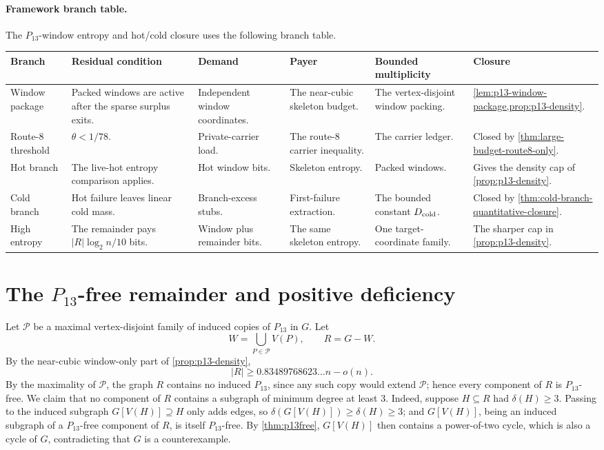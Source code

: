 \documentclass[11pt]{article}
\newcommand{\FrameworkBranchTableHeader}{%
\toprule
\textbf{Branch} & \textbf{Residual condition} & \textbf{Demand} & \textbf{Payer} & \textbf{Bounded multiplicity} & \textbf{Closure}\\
\midrule
}
\begin{document}
\paragraph{Framework branch table.}
The \(P_{13}\)-window entropy and hot/cold closure uses the following branch
table.
\begin{longtable}{L{0.13\textwidth} L{0.19\textwidth} L{0.14\textwidth} L{0.14\textwidth} L{0.17\textwidth} L{0.17\textwidth}}
\FrameworkBranchTableHeader
Window package
&
Packed windows are active after the sparse surplus exits.
&
Independent window coordinates.
&
The near-cubic skeleton budget.
&
The vertex-disjoint window packing.
&
\cref{lem:p13-window-package,prop:p13-density}.
\\
\addlinespace
Route-8 threshold
&
\(\theta<1/78\).
&
Private-carrier load.
&
The route-8 carrier inequality.
&
The carrier ledger.
&
Closed by \cref{thm:large-budget-route8-only}.
\\
\addlinespace
Hot branch
&
The live-hot entropy comparison applies.
&
Hot window bits.
&
Skeleton entropy.
&
Packed windows.
&
Gives the density cap of \cref{prop:p13-density}.
\\
\addlinespace
Cold branch
&
Hot failure leaves linear cold mass.
&
Branch-excess stubs.
&
First-failure extraction.
&
The bounded constant \(D_{\rm cold}\).
&
Closed by \cref{thm:cold-branch-quantitative-closure}.
\\
\addlinespace
High entropy
&
The remainder pays \(|R|\log_2 n/10\) bits.
&
Window plus remainder bits.
&
The same skeleton entropy.
&
One target-coordinate family.
&
The sharper cap in \cref{prop:p13-density}.
\\
\bottomrule
\end{longtable}


\section{The \texorpdfstring{$P_{13}$}{P13}-free remainder and positive deficiency}\label{sec:remainder}

Let $\mathcal P$ be a maximal vertex-disjoint family of induced copies of $P_{13}$ in $G$.  Let
\[
W=\bigcup_{P\in\mathcal P}V(P),
\qquad
R=G-W.
\]
By the near-cubic window-only part of \cref{prop:p13-density},
\[
|R|\ge0.83489768623\ldots n-o(n).
\]
By the maximality of $\mathcal P$, the graph $R$ contains no induced $P_{13}$, since any such copy would extend $\mathcal P$; hence every component of $R$ is $P_{13}$-free.  We claim that no component of $R$ contains a subgraph of minimum degree at least $3$.  Indeed, suppose $H\subseteq R$ had $\delta(H)\ge3$.  Passing to the induced subgraph $G[V(H)]\supseteq H$ only adds edges, so $\delta(G[V(H)])\ge\delta(H)\ge3$; and $G[V(H)]$, being an induced subgraph of a $P_{13}$-free component of $R$, is itself $P_{13}$-free.  By \cref{thm:p13free}, $G[V(H)]$ then contains a power-of-two cycle, which is also a cycle of $G$, contradicting that $G$ is a counterexample.
\end{document}
